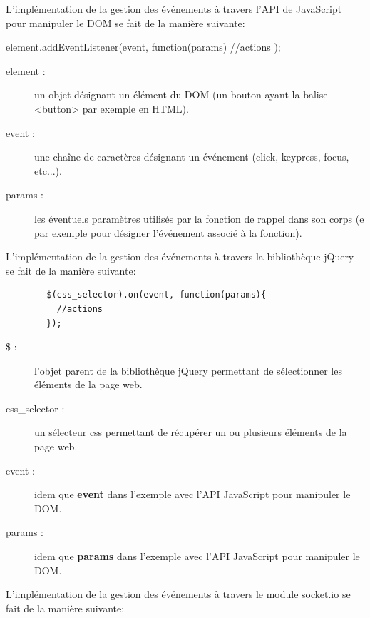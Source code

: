 \documentclass[12pt]{report}
\begin{document}
	L'implémentation de la gestion des événements à travers l'API de JavaScript pour manipuler le DOM se fait de la manière suivante:

	\begin{verbatimtab}[4]
		element.addEventListener(event, function(params){
			//actions
		});
	\end{verbatimtab}

	\begin{description}
		\item[element :]{
			un objet désignant un élément du DOM
			(un bouton ayant la balise <button> par exemple en HTML).
		}
		\item[event :]{
			une chaîne de caractères désignant un événement
			(click, keypress, focus, etc...).
		}
		\item[params :]{
			les éventuels paramètres utilisés par la fonction de rappel dans son corps
			(e par exemple pour désigner l'événement associé à la fonction).
		}
	\end{description}

	L'implémentation de la gestion des événements à travers la bibliothèque jQuery se fait de la manière suivante:

	\begin{verbatim}
		$(css_selector).on(event, function(params){
		  //actions
		});
	\end{verbatim}

	\begin{description}
		\item[\$ :]{
			l'objet parent de la bibliothèque jQuery permettant de sélectionner les éléments de la page web.
		}
		\item[css\_selector :]{
			un sélecteur css permettant de récupérer un ou plusieurs éléments de la page web.
		}
		\item[event :]{
			idem que \textbf{event} dans l'exemple avec l'API JavaScript pour manipuler le DOM.
		}
		\item[params :]{
			idem que \textbf{params} dans l'exemple avec l'API JavaScript pour manipuler le DOM.
		}
	\end{description}

	L'implémentation de la gestion des événements à travers le module socket.io se fait de la manière suivante:
\end{document}

